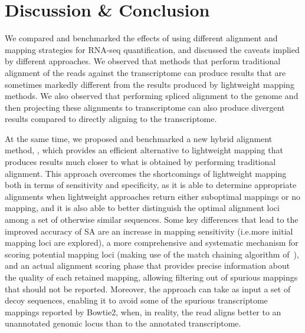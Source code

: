 \section{Discussion \& Conclusion}
\label{sec:conclusion}

We compared and benchmarked the effects of using different alignment and mapping
strategies for RNA-seq quantification, and discussed the caveats implied by
different approaches. We observed that methods that perform traditional alignment
of the reads against the transcriptome can produce results that are sometimes
markedly different from the results produced by lightweight mapping methods. We
also observed that performing spliced alignment to the genome and then projecting
these alignments to transcriptome can also produce divergent results compared
to directly aligning to the transcriptome.


At the same time, we proposed and benchmarked a new hybrid alignment method, \hsa,
which provides an efficient alternative to lightweight mapping that produces
results much closer to what is obtained by performing traditional alignment.
This approach overcomes the shortcomings of lightweight mapping both in terms of
sensitivity and specificity, as it is able to determine appropriate alignments
when lightweight approaches return either suboptimal mappings or no mapping, and
it is also able to better distinguish the optimal alignment loci among a set of
otherwise similar sequences. Some key differences that lead to the improved
accuracy of SA are an increase in mapping sensitivity (i.e.\@ more initial
mapping loci are explored), a more comprehensive and systematic mechanism for
scoring potential mapping loci (making use of the match chaining algorithm
of~\citet{minimap2}), and an actual alignment scoring phase that provides
precise information about the quality of each retained mapping, allowing
filtering out of spurious mappings that should not be reported. Moreover, the
\hsa approach can take as input a set of decoy sequences, enabling it to avoid some of the
spurious transcriptome mappings reported by Bowtie2, when, in reality, the read
aligns better to an unannotated genomic locus than to the annotated
transcriptome.


